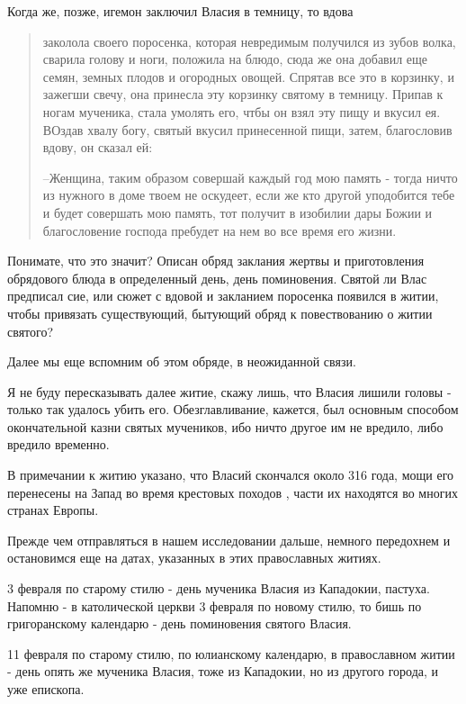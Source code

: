 \documentclass[a5paper,11pt,openany]{article}
\begin{document}
Когда же, позже, игемон заключил Власия в темницу, то вдова

\begin{quotation}
\noindent заколола своего поросенка, которая невредимым получился из зубов волка, сварила голову и ноги, положила на блюдо, сюда же она добавил еще семян, земных плодов и огородных овощей. Спрятав все это в корзинку, и зажегши свечу, она принесла эту корзинку святому в темницу. Припав к ногам мученика, стала умолять его, чтбы он взял эту пищу и вкусил ея. ВОздав хвалу богу, святый вкусил принесенной пищи, затем, благословив вдову, он сказал ей:

--Женщина, таким образом совершай каждый год мою память - тогда ничто из нужного в доме твоем не оскудеет, если же кто другой уподобится тебе и будет совершать мою память, тот получит в изобилии дары Божии и благословение господа пребудет на нем во все время его жизни.
\end{quotation}

   Понимате, что это значит? Описан обряд заклания жертвы и приготовления обрядового блюда в определенный день, день поминовения. Святой ли Влас предписал сие, или сюжет с вдовой и закланием поросенка появился в житии, чтобы привязать существующий, бытующий обряд к повествованию о житии святого?

   Далее мы еще вспомним об этом обряде, в неожиданной связи.

   Я не буду пересказывать далее житие, скажу лишь, что Власия лишили головы - только так удалось убить его. Обезглавливание, кажется, был основным способом окончательной казни святых мучеников, ибо ничто другое им не вредило, либо вредило временно.

   В примечании к житию указано, что Власий скончался около 316 года, мощи его перенесены на Запад во время крестовых походов , части их находятся во многих странах Европы.

   Прежде чем отправляться в нашем исследовании дальше, немного передохнем и остановимся еще на датах, указанных в этих православных житиях.

   3 февраля по старому стилю - день мученика Власия из Кападокии, пастуха. Напомню - в католической церкви 3 февраля по новому стилю, то бишь по григоранскому календарю - день поминовения святого Власия.

   11 февраля по старому стилю, по юлианскому календарю, в православном житии - день опять же мученика Власия, тоже из Кападокии, но из другого города, и уже епископа. 
\end{document}

